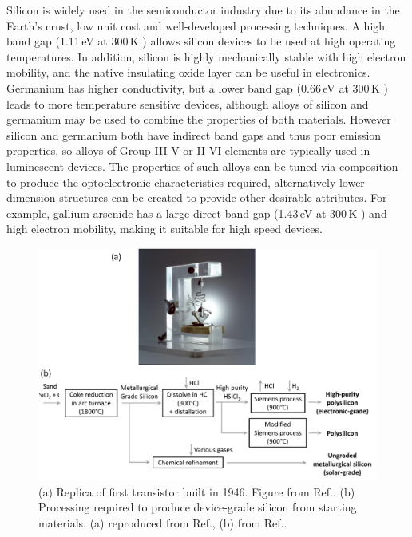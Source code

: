Silicon is widely used in the semiconductor industry due to its abundance in the Earth's crust, low unit cost and well-developed processing techniques. A high band gap (1.11\,eV at 300\,K \cite{Kittel1986}) %
allows silicon devices %
to be used at high operating temperatures. In addition, silicon is highly mechanically stable with high electron mobility, and the native insulating oxide layer can be useful in electronics. Germanium has higher conductivity, but a lower band gap (0.66\,eV at 300\,K \cite{Kittel1986}) leads to more temperature sensitive devices, although alloys of silicon and germanium may be used to combine the properties of both materials. However silicon and germanium both have indirect band gaps and thus poor emission properties, so alloys of Group III-V or II-VI elements are typically used in luminescent devices. The properties of such alloys can be tuned via composition to produce the optoelectronic characteristics required, alternatively lower dimension structures can be created to provide other desirable attributes. For example, gallium arsenide has a large direct band gap (1.43\,eV at 300\,K \cite{Kittel1986}) and high electron mobility, making it suitable for high speed devices.
\begin{figure}[h!]
\centering
\includegraphics[width=\textwidth]{Fig1}
\caption{(a) Replica of first transistor built in 1946. Figure from Ref.\!. (b) Processing required to produce device-grade silicon from starting materials. (a) reproduced from Ref.\!, (b) from Ref.\!.}
\label{1Fig1}
\end{figure}

